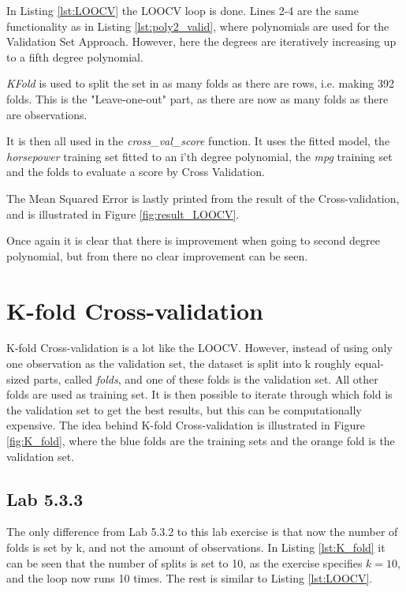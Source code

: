 In Listing \ref{lst:LOOCV} the LOOCV loop is done. Lines 2-4 are the same functionality as in Listing \ref{lst:poly2_valid}, where polynomials are used for the Validation Set Approach. However, here the degrees are iteratively increasing up to a fifth degree polynomial.

\emph{KFold} is used to split the set in as many folds as there are rows, i.e. making 392 folds. This is the "Leave-one-out" part, as there are now as many folds as there are observations. 

It is then all used in the \emph{cross\_val\_score} function. It uses the fitted model, the \emph{horsepower} training set fitted to an i'th degree polynomial, the \emph{mpg} training set and the folds to evaluate a score by Cross Validation.

The Mean Squared Error is lastly printed from the result of the Cross-validation, and is illustrated in Figure \ref{fig:result_LOOCV}.


Once again it is clear that there is improvement when going to second degree polynomial, but from there no clear improvement can be seen. 


\section{K-fold Cross-validation}
K-fold Cross-validation is a lot like the LOOCV. However, instead of using only one observation as the validation set, the dataset is split into k roughly equal-sized parts, called \emph{folds}, and one of these folds is the validation set. All other folds are used as training set. It is then possible to iterate through which fold is the validation set to get the best results, but this can be computationally expensive. The idea behind K-fold Cross-validation is illustrated in Figure \ref{fig:K_fold}, where the blue folds are the training sets and the orange fold is the validation set. 


\subsection{Lab 5.3.3}
The only difference from Lab 5.3.2 to this lab exercise is that now the number of folds is set by k, and not the amount of observations. In Listing \ref{lst:K_fold} it can be seen that the number of splits is set to 10, as the exercise specifies $k=10$, and the loop now runs 10 times. The rest is similar to Listing \ref{lst:LOOCV}.

